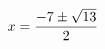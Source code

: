 \documentclass[preview]{standalone}
\begin{document}
\begin{align*}
\special{dvisvgm:raw <g id='unique000'>}x=\frac{-7\pm{\sqrt{13}}}{2}\special{dvisvgm:raw </g>}
\end{align*}
\end{document}
